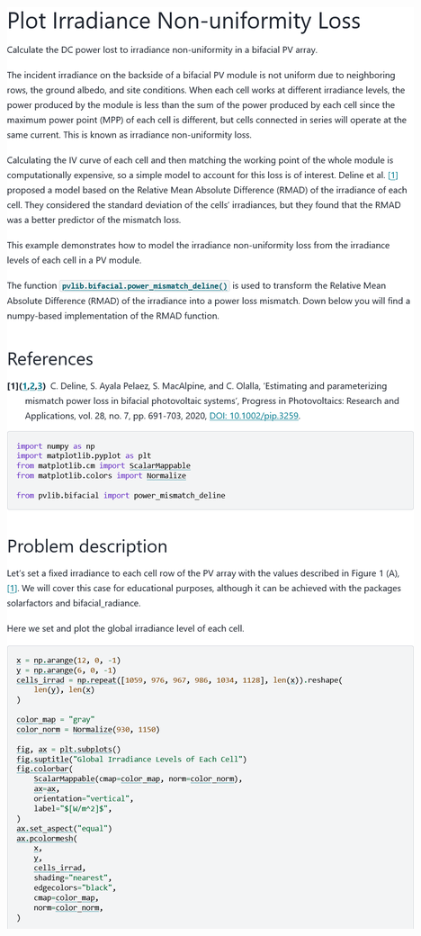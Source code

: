\begin{myparindent}{0pt}
\includegraphics[width=\linewidth,height=0.9\textheight,keepaspectratio]{images/docs_examples_cut/nonuniformity_0.png}


\end{myparindent}
